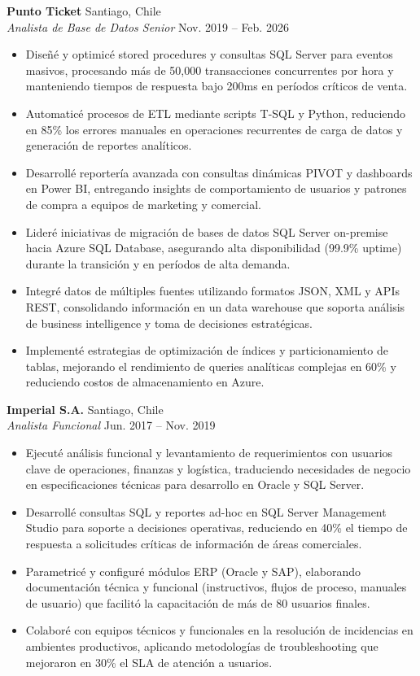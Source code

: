 \documentclass[11pt,letterpaper]{article}
\begin{document}
\textbf{Punto Ticket} \hfill Santiago, Chile\\
\textit{Analista de Base de Datos Senior} \hfill Nov. 2019 – Feb. 2026
\begin{itemize}
  \item Diseñé y optimicé stored procedures y consultas SQL Server para eventos masivos, procesando más de 50,000 transacciones concurrentes por hora y manteniendo tiempos de respuesta bajo 200ms en períodos críticos de venta.
  \item Automaticé procesos de ETL mediante scripts T-SQL y Python, reduciendo en 85\% los errores manuales en operaciones recurrentes de carga de datos y generación de reportes analíticos.
  \item Desarrollé reportería avanzada con consultas dinámicas PIVOT y dashboards en Power BI, entregando insights de comportamiento de usuarios y patrones de compra a equipos de marketing y comercial.
  \item Lideré iniciativas de migración de bases de datos SQL Server on-premise hacia Azure SQL Database, asegurando alta disponibilidad (99.9\% uptime) durante la transición y en períodos de alta demanda.
  \item Integré datos de múltiples fuentes utilizando formatos JSON, XML y APIs REST, consolidando información en un data warehouse que soporta análisis de business intelligence y toma de decisiones estratégicas.
  \item Implementé estrategias de optimización de índices y particionamiento de tablas, mejorando el rendimiento de queries analíticas complejas en 60\% y reduciendo costos de almacenamiento en Azure.
\end{itemize}
\vspace{2pt}
\textbf{Imperial S.A.} \hfill Santiago, Chile\\
\textit{Analista Funcional} \hfill Jun. 2017 – Nov. 2019
\begin{itemize}
  \item Ejecuté análisis funcional y levantamiento de requerimientos con usuarios clave de operaciones, finanzas y logística, traduciendo necesidades de negocio en especificaciones técnicas para desarrollo en Oracle y SQL Server.
  \item Desarrollé consultas SQL y reportes ad-hoc en SQL Server Management Studio para soporte a decisiones operativas, reduciendo en 40\% el tiempo de respuesta a solicitudes críticas de información de áreas comerciales.
  \item Parametricé y configuré módulos ERP (Oracle y SAP), elaborando documentación técnica y funcional (instructivos, flujos de proceso, manuales de usuario) que facilitó la capacitación de más de 80 usuarios finales.
  \item Colaboré con equipos técnicos y funcionales en la resolución de incidencias en ambientes productivos, aplicando metodologías de troubleshooting que mejoraron en 30\% el SLA de atención a usuarios.
\end{itemize}
\end{document}
